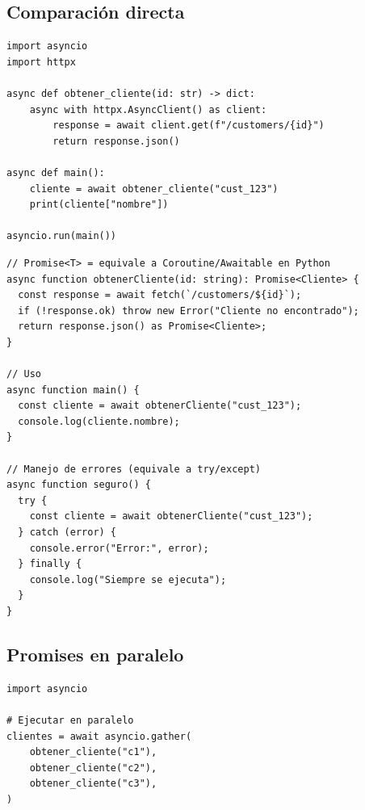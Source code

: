 \documentclass[11pt,a4paper]{article}
\begin{document}
\subsection{Comparación directa}

\begin{pybox}
\begin{lstlisting}[style=python]
import asyncio
import httpx

async def obtener_cliente(id: str) -> dict:
    async with httpx.AsyncClient() as client:
        response = await client.get(f"/customers/{id}")
        return response.json()

async def main():
    cliente = await obtener_cliente("cust_123")
    print(cliente["nombre"])

asyncio.run(main())
\end{lstlisting}
\end{pybox}

\begin{tsbox}
\begin{lstlisting}[style=typescript]
// Promise<T> = equivale a Coroutine/Awaitable en Python
async function obtenerCliente(id: string): Promise<Cliente> {
  const response = await fetch(`/customers/${id}`);
  if (!response.ok) throw new Error("Cliente no encontrado");
  return response.json() as Promise<Cliente>;
}

// Uso
async function main() {
  const cliente = await obtenerCliente("cust_123");
  console.log(cliente.nombre);
}

// Manejo de errores (equivale a try/except)
async function seguro() {
  try {
    const cliente = await obtenerCliente("cust_123");
  } catch (error) {
    console.error("Error:", error);
  } finally {
    console.log("Siempre se ejecuta");
  }
}
\end{lstlisting}
\end{tsbox}

\subsection{Promises en paralelo}

\begin{pybox}
\begin{lstlisting}[style=python]
import asyncio

# Ejecutar en paralelo
clientes = await asyncio.gather(
    obtener_cliente("c1"),
    obtener_cliente("c2"),
    obtener_cliente("c3"),
)
\end{lstlisting}
\end{pybox}
\end{document}
